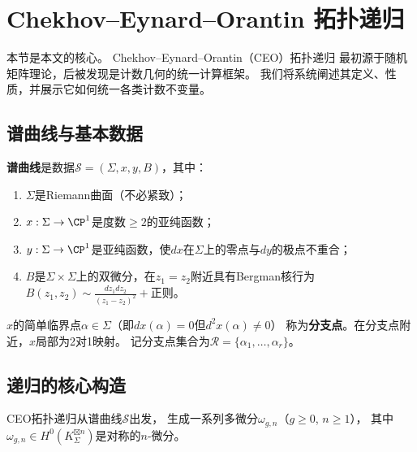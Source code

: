 
\section{Chekhov--Eynard--Orantin 拓扑递归}\label{sec:toprec}

本节是本文的核心。
Chekhov--Eynard--Orantin（CEO）拓扑递归\cite{EO2007, EO2015}
最初源于随机矩阵理论，后被发现是计数几何的统一计算框架。
我们将系统阐述其定义、性质，并展示它如何统一各类计数不变量。

\subsection{谱曲线与基本数据}

\begin{definition}[谱曲线]\label{def:spectral}
\textbf{谱曲线}是数据$\mathcal{S} = (\Sigma, x, y, B)$，其中：
\begin{enumerate}[label=(\arabic*)]
\item $\Sigma$是Riemann曲面（不必紧致）；
\item $x: \Sigma \to \CP^1$是度数$\geq 2$的亚纯函数；
\item $y: \Sigma \to \CP^1$是亚纯函数，使$dx$在$\Sigma$上的零点与$dy$的极点不重合；
\item $B$是$\Sigma \times \Sigma$上的双微分，在$z_1 = z_2$附近具有Bergman核行为
$B(z_1, z_2) \sim \frac{dz_1 dz_2}{(z_1 - z_2)^2} + \text{正则}$。
\end{enumerate}
\end{definition}

\begin{definition}[分支点]\label{def:branch}
$x$的简单临界点$\alpha \in \Sigma$（即$dx(\alpha) = 0$但$d^2x(\alpha) \neq 0$）
称为\textbf{分支点}。在分支点附近，$x$局部为2对1映射。
记分支点集合为$\mathcal{R} = \{\alpha_1, \ldots, \alpha_r\}$。
\end{definition}

\subsection{递归的核心构造}

CEO拓扑递归从谱曲线$\mathcal{S}$出发，
生成一系列多微分$\omega_{g,n}$（$g \geq 0$, $n \geq 1$），
其中$\omega_{g,n} \in H^0(K_\Sigma^{\boxtimes n})$是对称的$n$-微分。

